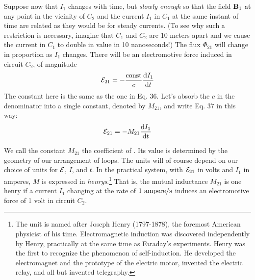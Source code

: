 Suppose now that $I_1$ changes with time, but \emph{slowly enough} so that
the field $\mathbf{B}_1$ at any point in the vicinity of $C_2$ and the current $I_1$ in $C_1$
at the same instant of time are related as they would be for steady
currents. (To see why such a restriction is necessary, imagine that $C_1$
and $C_2$ are 10 meters apart and we cause the current in $C_1$ to double in
value in 10 nanoseconds!) The flux $\Phi_{21}$ will change in proportion
as $I_1$ changes. There will be an electromotive force induced in
circuit $C_2$, of magnitude
\begin{equation}
  \mathcal{E}_{21} = -\frac{\text{const}}{c} \frac{\textup{d} I_1}{\textup{d} t}
\end{equation}
The constant here is the same as the one in Eq. 36. Let's absorb the
$c$ in the denominator into a single constant, denoted by $M_{21}$, and write
Eq. 37 in this way:
\begin{equation}
  \mathcal{E}_{21} = -M_{21} \frac{\textup{d} I_1}{\textup{d} t}
\end{equation}

We call the constant $M_{21}$ the coefficient of . Its
value is determined by the geometry of our arrangement of loops.
The units will of course depend on our choice of units for $\mathcal{E}$, $I$, and $t$.
In the practical system, with $\mathcal{E}_{21}$ in volts and $I_1$ in amperes, $M$ is expressed
in \emph{henrys}.\footnote{The unit is named after 
Joseph Henry (1797-1878), the foremost American physicist
of his time. Electromagnetic induction was discovered independently by Henry, practically
at the same time as Faraday's experiments. Henry was the first to recognize the
phenomenon of self-induction. He developed the electromagnet and the prototype of
the electric motor, invented the electric relay, and all but invented telegraphy.}
That is, the mutual inductance $M_{21}$ is one henry
if a current $I_1$ changing at the rate of $1\ \text{ampere}/\sunit$ induces an electromotive
force of 1 volt in circuit $C_2$.

